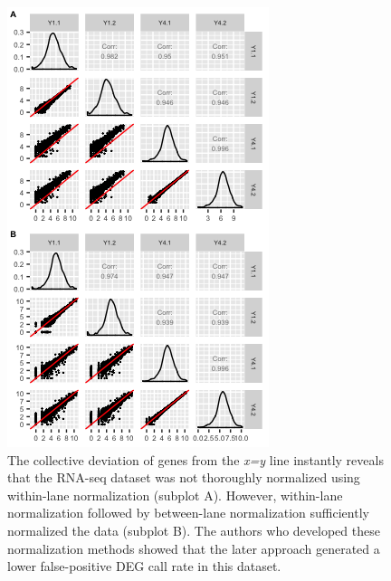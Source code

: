 \documentclass{bioinfo}
\begin{document}
\begin{figure}[!tpb]
\centerline{\includegraphics[width=\columnwidth]{../MakeFigures/yeastWithinBetween.jpg}}
\caption{The collective deviation of genes from the \textit{x=y} line instantly reveals that the RNA-seq dataset was not thoroughly normalized using within-lane normalization (subplot A). However, within-lane normalization followed by between-lane normalization sufficiently normalized the data (subplot B). The authors who developed these normalization methods showed that the later approach generated a lower false-positive DEG call rate in this dataset.
\label{yeastWithinBetween}}
\end{figure}
\end{document}
